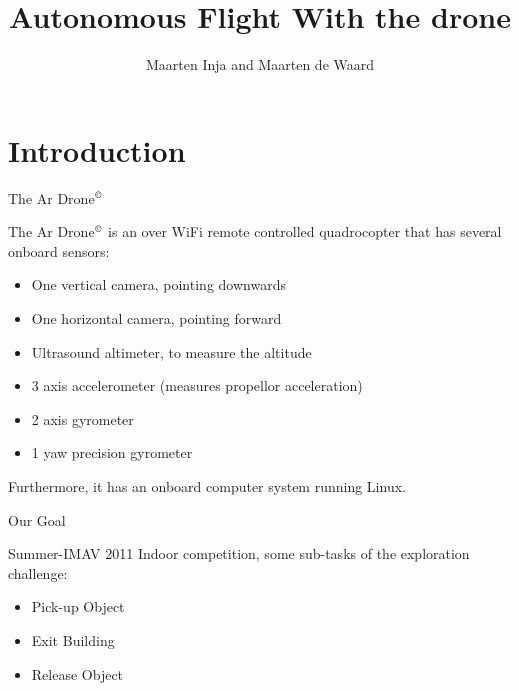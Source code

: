 \documentclass{beamer}
\title{Autonomous Flight With the \Ardrone drone}
\author{Maarten Inja and Maarten de Waard}
\institute{UvA}
\newcommand{\Ardrone}{Ar Drone$^{\copyright}$ }
\newcommand{\slide}[2]
{
\begin{frame}
\begin{block}{#1} 

#2

\end{block} \end{frame}
}
\begin{document}
\begin{frame}
\titlepage
\end{frame}

\section{Introduction}


% 


\slide{The \Ardrone}{
The \Ardrone is an over WiFi remote controlled quadrocopter that has several onboard sensors:
\begin{itemize}
	\item One vertical camera, pointing downwards
	\item One horizontal camera, pointing forward 
	\item Ultrasound altimeter, to measure the altitude
    \item 3 axis accelerometer (measures propellor acceleration)
    \item 2 axis gyrometer 
    \item 1 yaw precision gyrometer
\end{itemize}
Furthermore, it has an onboard computer system running Linux. 


}

\slide{Our Goal}{
Summer-IMAV 2011 Indoor competition, some sub-tasks of the exploration challenge:
\begin{itemize}
    \item Pick-up Object
    \item Exit Building
    \item Release Object
\end{itemize}


}
\end{document}
